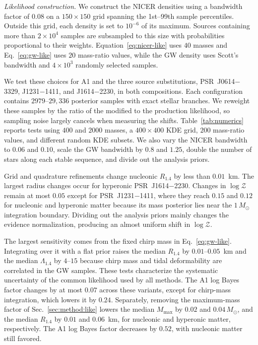 \documentclass[aps,prd,twocolumn,superscriptaddress,nofootinbib,longbibliography]{revtex4-2}
\begin{document}
\emph{Likelihood construction.} We construct the NICER densities using a
bandwidth factor of $0.08$ on a $150\times150$ grid spanning the 1st--99th
sample percentiles. Outside this grid, each density is set to $10^{-6}$ of its
maximum. Sources containing more than $2\times10^4$ samples are subsampled to
this size with probabilities proportional to their weights.
Equation~\eqref{eq:nicer-like} uses $40$ masses and Eq.~\eqref{eq:gw-like}
uses $20$ mass-ratio values, while the GW density uses Scott's bandwidth and
$4\times10^3$ randomly selected samples.

We test these choices for A1 and the three source substitutions,
PSR~J0614$-$3329, J1231$-$1411, and J1614$-$2230, in both compositions. Each
configuration contains $2979$--$29{,}336$ posterior samples with exact stellar
branches. We reweight these samples by the ratio of the modified to the
production likelihood, so sampling noise largely cancels when measuring the
shifts. Table~\ref{tab:numerics} reports tests using $400$ and $2000$ masses, a
$400\times400$ KDE grid, $200$ mass-ratio values, and different random KDE
subsets. We also vary the NICER bandwidth to $0.06$ and $0.10$, scale the GW
bandwidth by $0.8$ and $1.25$, double the number of stars along each stable
sequence, and divide out the analysis priors.

Grid and quadrature refinements change nucleonic $R_{1.4}$ by less than
$0.01$~km. The largest radius changes occur for hyperonic PSR~J1614$-$2230.
Changes in $\log\mathcal Z$ remain at most $0.05$ except for
PSR~J1231$-$1411, where they reach $0.15$ and $0.12$ for nucleonic and
hyperonic matter because its mass posterior lies near the $1\,M_\odot$
integration boundary. Dividing out the analysis priors mainly changes the
evidence normalization, producing an almost uniform shift in $\log\mathcal Z$.

The largest sensitivity comes from the fixed chirp mass in
Eq.~\eqref{eq:gw-like}. Integrating over it with a flat prior raises the median
$R_{1.4}$ by $0.01$--$0.05$~km and the median $\Lambda_{1.4}$ by $4$--$15$
because chirp mass and tidal deformability are correlated in the GW samples.
These tests characterize the systematic uncertainty of the common likelihood
used by all methods. The A1 log Bayes factor changes by at most $0.07$ across
these variants, except for chirp-mass integration, which lowers it by $0.24$.
Separately, removing the maximum-mass factor of Sec.~\ref{sec:method:like}
lowers the median $M_{\max}$ by $0.02$ and $0.04\,M_\odot$, and the median
$R_{1.4}$ by $0.01$ and $0.06$~km, for nucleonic and hyperonic matter,
respectively. The A1 log Bayes factor decreases by $0.52$, with nucleonic matter
still favored.
\end{document}
